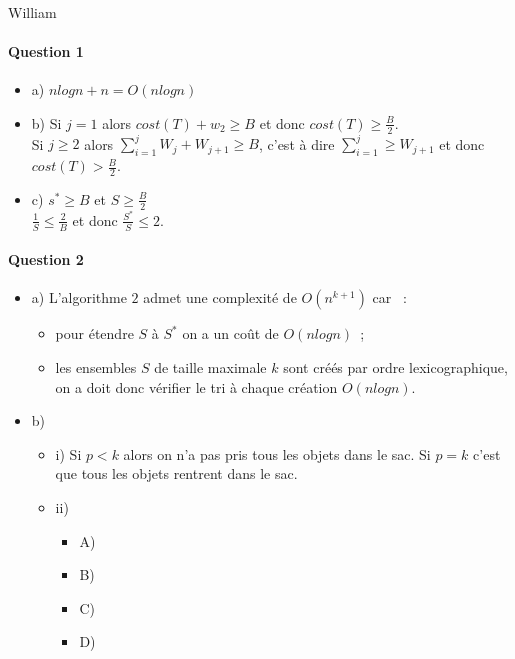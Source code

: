 William
\paragraph{Question 1}
\begin{itemize}
\item a) $nlogn+n = O(nlogn)$
\item b) Si $j = 1$ alors $cost(T) + w_{2} \geqslant B$ et donc $cost(T) \geqslant \frac{B}{2}$.\\
Si $j \geqslant 2$ alors $\sum_{i=1}^{j} W_{j} + W_{j+1} \geqslant B$, c'est à dire $\sum_{i=1}^{j} \geqslant W_{j+1}$ et donc $cost(T) > \frac{B}{2}$.
\item c)  $s^{*} \geqslant B$ et $S \geqslant \frac{B}{2}$\\
$\frac{1}{S} \leqslant \frac{2}{B}$ et donc $\frac{S^{*}}{S} \leqslant 2$.
\end{itemize}

\paragraph{Question 2}
\begin{itemize}
\item a) L'algorithme $2$ admet une complexité de $O(n^{k+1})$ car ~:
\begin{itemize}
\item pour étendre $S$ à $S^*$ on a un coût de $O(nlogn)$~;
\item les ensembles $S$ de taille maximale $k$ sont créés par ordre lexicographique, on a
doit donc vérifier le tri à chaque création $O(nlogn)$.
\end{itemize}
\item b)
\begin{itemize}
\item i) Si $p < k$ alors on n'a pas pris tous les objets dans le
sac. Si $p = k$ c'est que tous les objets rentrent dans le sac. 
\item ii)
\begin{itemize}
\item A)
\item B)
\item C)
\item D)
\end{itemize}
\end{itemize}
\end{itemize}
